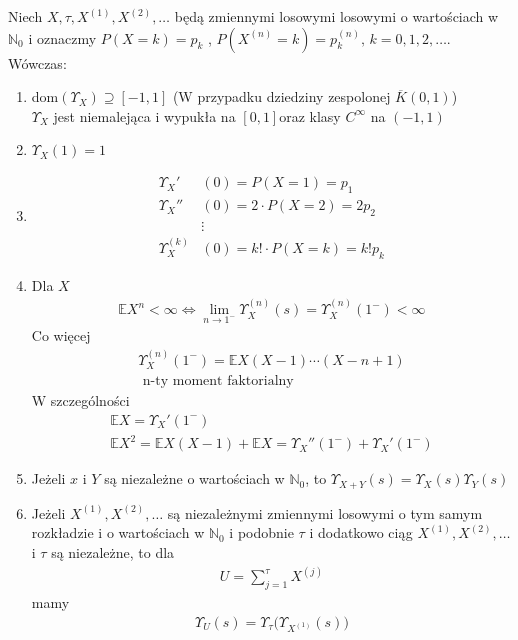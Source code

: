 \begin{twr}
Niech $ X,\tau,X^{(1)},X^{(2)},\dots $ będą zmiennymi losowymi losowymi o wartościach w $ \mathbb N _0 $ i oznaczmy $ P\left(X=k\right)=p_k $ , $ P\left(X^{(n)}=k\right)=p_k^{(n)} ,\,k=0,1,2,\dots$. Wówczas:
\begin{enumerate}
\item dom$ \left(\Upsilon_X\right) \supseteq[-1,1]$
(W przypadku dziedziny zespolonej $ \overline K(0,1) $)\\
$ \Upsilon_X $ jest niemalejąca i wypukła na $ [0,1] $oraz klasy $ C^\infty  $ na $ (-1,1) $
\item $ \Upsilon_X(1)=1 $
\item \begin{align*}
\Upsilon_X'&(0)= P\left(X=1\right)=p_1        \\
\Upsilon_X''&(0)=2\cdot P\left(X=2\right)=2p_2\\
&\vdots                                       \\
\Upsilon_X^{(k)}&(0)=k!\cdot P\left(X=k\right)=k!p_k
\end{align*}
\item Dla $ X $
\begin{gather*}
\mathbb E X^n<\infty 
\Leftrightarrow
\lim\limits_{n\to1^-} \Upsilon_X^{(n)}(s)
=
\Upsilon_X^{(n)}(1^-)<\infty 
\end{gather*}
Co więcej
\begin{gather*}
\Upsilon_X^{(n)}(1^-)
=
\mathbb E X(X-1)\cdots(X-n+1)\\
\text{  n-ty moment faktorialny}
\end{gather*}
W szczególności
\begin{gather*}
\mathbb E X
=
\Upsilon_X'(1^-)\\
\mathbb E X^2
=
\mathbb E X(X-1)+\mathbb E X
=
\Upsilon_X''(1^-)+\Upsilon_X'(1^-)
\end{gather*}
\item Jeżeli $ x $ i $ Y $ są niezależne o wartościach w $ \mathbb N _0 $, to $ \Upsilon_{X+Y}(s)=\Upsilon_X(s)\Upsilon_Y(s) $
\item Jeżeli $ X^{(1)},X^{(2)},\dots $ są niezależnymi zmiennymi losowymi o tym samym rozkładzie i o wartościach w $ \mathbb N _0 $ i podobnie $ \tau $ i dodatkowo ciąg $ X^{(1)},X^{(2)},\dots $ i $ \tau $ są niezależne, to dla 
\begin{gather*}
U=\sum_{j=1}^{\tau}X^{(j)}
\end{gather*}
mamy
\begin{gather*}
\Upsilon_U(s)=\Upsilon_\tau \bigl(\Upsilon_{X^{(1)}}(s)\bigr)

\end{gather*}
\end{enumerate}
\end{twr}
